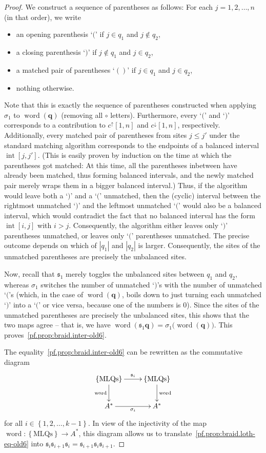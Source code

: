 \documentclass[reqno]{amsart}
\newcommand{\0}{\phantom{c}}
\DeclareMathOperator{\inter}{int} %
\DeclareMathOperator{\word}{word} %
\newcommand{\qq}{\mathbf{q}}
\newcommand{\fraks}{\mathfrak{s}}
\newenvironment{verlong}{}{}
\newcommand{\set}[1]{\left\{ #1 \right\}}
\newcommand{\abs}[1]{\left| #1 \right|}
\theoremstyle{plain}
\theoremstyle{definition}
\numberwithin{equation}{section}
\begin{document}
\begin{verlong}
\begin{proof}
We construct a sequence of parentheses as follows: For each $j = 1, 2, \dotsc, n$ (in that order), we write
\begin{itemize}
\item an opening parenthesis `$($' if $j \in q_1$ and $j \notin q_2$,
\item a closing parenthesis `$)$' if $j \notin q_1$ and $j \in q_2$,
\item a matched pair of parentheses `$()$' if $j \in q_1$ and $j \in q_2$,
\item nothing otherwise.
\end{itemize}
Note that this is exactly the sequence of parentheses constructed when applying $\sigma_1$ to $\word(\qq)$ (removing all $\circ$ letters).
Furthermore, every `$($' and `$)$' corresponds to a contribution to $c^{\uparrow}[1,n]$ and $c^{\downarrow}[1,n]$, respectively.
Additionally, every matched pair of parentheses from sites $j \leq j'$ under the standard matching algorithm corresponds to the endpoints of a balanced interval $\inter[j,j']$. (This is easily proven by induction on the time at which the parentheses got matched: At this time, all the parentheses inbetween have already been matched, thus forming balanced intervals, and the newly matched pair merely wraps them in a bigger balanced interval.)
Thus, if the algorithm would leave both a `$)$' and a `$($' unmatched, then the (cyclic) interval between the rightmost unmatched `$)$' and the leftmost unmatched `$($' would also be a balanced interval, which would contradict the fact that no balanced interval has the form $\inter[i,j]$ with $i > j$.
Consequently, the algorithm either leaves only `$)$' parentheses unmatched, or leaves only `$($' parentheses unmatched.
The precise outcome depends on which of $\abs{q_1}$ and $\abs{q_2}$ is larger.
Consequently, the sites of the unmatched parentheses are precisely the unbalanced sites.

Now, recall that $\fraks_1$ merely toggles the unbalanced sites between $q_1$ and $q_2$, whereas $\sigma_1$ switches the number of unmatched `$)$'s with the number of unmatched `$($'s (which, in the case of $\word(\qq)$, boils down to just turning each unmatched `$)$' into a `$($' or vice versa, because one of the numbers is $0$). Since the sites of the unmatched parentheses are precisely the unbalanced sites, this shows that the two maps agree -- that is, we have $\word(\fraks_1 \qq) = \sigma_1\bigl( \word(\qq) \bigr)$. This proves~\eqref{pf.prop:braid.inter-old6}.

The equality~\eqref{pf.prop:braid.inter-old6} can be rewritten as the
commutative diagram
\[
\xymatrix{
 \set{\text{MLQs}} \ar[r]^{\fraks_i} \ar[d]_{\word} & \set{\text{MLQs}} \ar[d]^{\word} \\
 A^* \ar[r]_{\sigma_i} & A^*
}
\]
for all $i \in \set{1, 2, \dotsc, k-1}$.
In view of the injectivity of the map $\word \colon \set{\text{MLQs}} \to A^*$,
this diagram allows us to translate~\eqref{pf.prop:braid.loth-eq-old6} into
$\fraks_i \fraks_{i+1} \fraks_i = \fraks_{i+1} \fraks_i \fraks_{i+1}$.
\end{proof}


\end{verlong}
\end{document}
